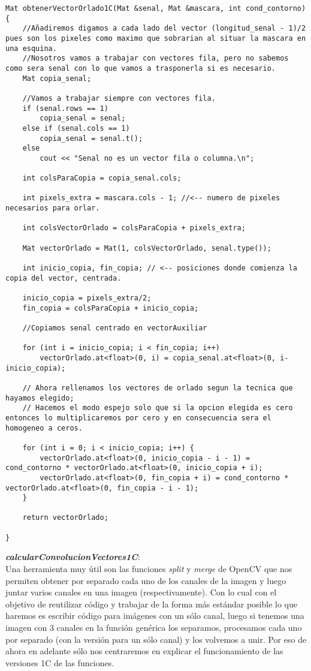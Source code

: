 \documentclass[10pt,a4paper]{article}
\begin{document}
\begin{lstlisting}
Mat obtenerVectorOrlado1C(Mat &senal, Mat &mascara, int cond_contorno) {
	//Añadiremos digamos a cada lado del vector (longitud_senal - 1)/2 pues son los pixeles como maximo que sobrarian al situar la mascara en una esquina.
	//Nosotros vamos a trabajar con vectores fila, pero no sabemos como sera senal con lo que vamos a trasponerla si es necesario.
	Mat copia_senal;

	//Vamos a trabajar siempre con vectores fila.
	if (senal.rows == 1)
		copia_senal = senal;
	else if (senal.cols == 1)
		copia_senal = senal.t();
	else
		cout << "Senal no es un vector fila o columna.\n";

	int colsParaCopia = copia_senal.cols;	
	
	int pixels_extra = mascara.cols - 1; //<-- numero de pixeles necesarios para orlar.

	int colsVectorOrlado = colsParaCopia + pixels_extra;

	Mat vectorOrlado = Mat(1, colsVectorOrlado, senal.type());

	int inicio_copia, fin_copia; // <-- posiciones donde comienza la copia del vector, centrada.

	inicio_copia = pixels_extra/2;
	fin_copia = colsParaCopia + inicio_copia;

	//Copiamos senal centrado en vectorAuxiliar

	for (int i = inicio_copia; i < fin_copia; i++)
		vectorOrlado.at<float>(0, i) = copia_senal.at<float>(0, i-inicio_copia);		
	
	// Ahora rellenamos los vectores de orlado segun la tecnica que hayamos elegido;
	// Hacemos el modo espejo solo que si la opcion elegida es cero entonces lo multiplicaremos por cero y en consecuencia sera el homogeneo a ceros.
	
	for (int i = 0; i < inicio_copia; i++) {
		vectorOrlado.at<float>(0, inicio_copia - i - 1) = cond_contorno * vectorOrlado.at<float>(0, inicio_copia + i);
		vectorOrlado.at<float>(0, fin_copia + i) = cond_contorno * vectorOrlado.at<float>(0, fin_copia - i - 1);
	}

	return vectorOrlado;

}
\end{lstlisting}

\textbf{\textit{calcularConvolucionVectores1C}}:\\

Una herramienta muy útil son las funciones \textit{split} y \textit{merge} de OpenCV que nos permiten obtener por separado cada uno de los canales de la imagen y luego juntar varios canales en una imagen (respectivamente). Con lo cual con el objetivo de reutilizar código y trabajar de la forma más estándar posible lo que haremos es escribir código para imágenes con un sólo canal, luego si tenemos una imagen con 3 canales en la función genérica los separamos, procesamos cada uno por separado (con la versión para un sólo canal) y los volvemos a unir. Por eso de ahora en adelante sólo nos centraremos en explicar el funcionamiento de las versiones 1C de las funciones.\\
\end{document}
